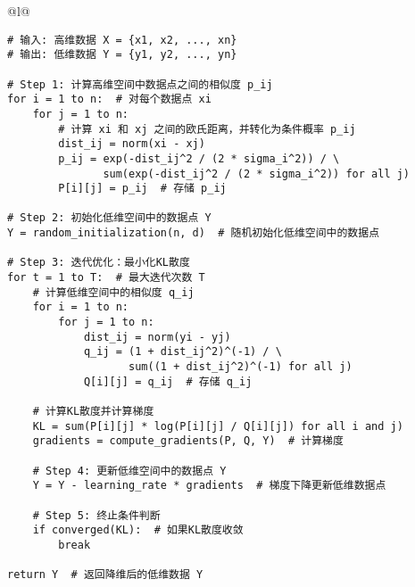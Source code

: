 \documentclass[master]{thesis-uestc}
\begin{document}
\begin{table}[]
    \caption{t-SNE算法伪代码}
    \begin{tabular}{@{}l@{}} %
    \toprule
     \\ %
    \midrule
    \begin{lstlisting}[basicstyle=\ttfamily,frame=none]
# 输入: 高维数据 X = {x1, x2, ..., xn}
# 输出: 低维数据 Y = {y1, y2, ..., yn}

# Step 1: 计算高维空间中数据点之间的相似度 p_ij
for i = 1 to n:  # 对每个数据点 xi
    for j = 1 to n:
        # 计算 xi 和 xj 之间的欧氏距离，并转化为条件概率 p_ij
        dist_ij = norm(xi - xj)
        p_ij = exp(-dist_ij^2 / (2 * sigma_i^2)) / \
               sum(exp(-dist_ij^2 / (2 * sigma_i^2)) for all j)
        P[i][j] = p_ij  # 存储 p_ij
    
# Step 2: 初始化低维空间中的数据点 Y
Y = random_initialization(n, d)  # 随机初始化低维空间中的数据点

# Step 3: 迭代优化：最小化KL散度
for t = 1 to T:  # 最大迭代次数 T
    # 计算低维空间中的相似度 q_ij
    for i = 1 to n:
        for j = 1 to n:
            dist_ij = norm(yi - yj)
            q_ij = (1 + dist_ij^2)^(-1) / \
                   sum((1 + dist_ij^2)^(-1) for all j)
            Q[i][j] = q_ij  # 存储 q_ij

    # 计算KL散度并计算梯度
    KL = sum(P[i][j] * log(P[i][j] / Q[i][j]) for all i and j)
    gradients = compute_gradients(P, Q, Y)  # 计算梯度
    
    # Step 4: 更新低维空间中的数据点 Y
    Y = Y - learning_rate * gradients  # 梯度下降更新低维数据点

    # Step 5: 终止条件判断
    if converged(KL):  # 如果KL散度收敛
        break

return Y  # 返回降维后的低维数据 Y
    \end{lstlisting} \\
    \bottomrule
    \end{tabular}
    \label{table:tsne_code}
\end{table}
\end{document}
